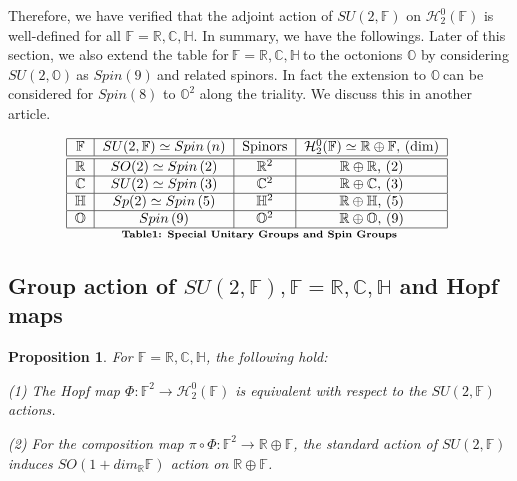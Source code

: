 \documentclass[a4paper]{article}%
\newtheorem{proposition}[theorem]{Proposition}
\begin{document}
Therefore, we have verified that the adjoint action of $SU(2,\mathbb{F})$ on
$\mathcal{H}_{2}^{0}(\mathbb{F})$ is well-defined for all $\mathbb{F}%
=\mathbb{R},\mathbb{C},\mathbb{H}$. In summary, we have the followings. Later
of this section, we also extend the table for$\ \mathbb{F}=\mathbb{R}%
,\mathbb{C},\mathbb{H\ }$to the octonions $\mathbb{O}$ by considering
$SU(2,\mathbb{O})\ $as $Spin\left(  9\right)  \ $and related spinors. In fact
the extension to $\mathbb{O\ }$can be considered for $Spin\left(  8\right)  $
to $\mathbb{O}^{2}$ along the triality. We discuss this in another article.%

\[
\underset{\text{\textbf{Table1: Special\ Unitary\ Groups\ and Spin Groups}}}{%
\begin{tabular}
[c]{|c|c|c|c|}\hline
$\mathbb{F}$ & $SU(2,\mathbb{F})\simeq Spin\left(  n\right)  $ & Spinors &
$\mathcal{H}_{2}^{0}(\mathbb{F})\simeq\mathbb{R}\oplus\mathbb{F}$, $\left(
\dim\right)  $\\\hline\hline
$\mathbb{R}$ & $SO(2)\simeq Spin\left(  2\right)  $ & $\mathbb{R}^{2}$ &
$\mathbb{R}\oplus\mathbb{R}$,$\mathbb{\ (}2\mathbb{)}$\\\hline
$\mathbb{C}$ & $SU(2)\simeq Spin\left(  3\right)  $ & $\mathbb{C}^{2}$ &
$\mathbb{R}\oplus\mathbb{C}$, $\mathbb{(}3\mathbb{)}$\\\hline
$\mathbb{H}$ & $Sp(2)\simeq Spin\left(  5\right)  $ & $\mathbb{H}^{2}$ &
$\mathbb{R}\oplus\mathbb{H}$,$\ \mathbb{(}5\mathbb{)}$\\\hline
$\mathbb{O}$ & $Spin\left(  9\right)  $ & $\mathbb{O}^{2}$ & $\mathbb{R}%
\oplus\mathbb{O}$,$\ \mathbb{(}9\mathbb{)}$\\\hline
\end{tabular}
\ }%
\]


\bigskip

\subsection{Group action of $SU(2,\mathbb{F}),\mathbb{F}=\mathbb{R}%
,\mathbb{C},\mathbb{H}$ and Hopf maps}

\begin{proposition}
\label{SORCH} For $\mathbb{F}=\mathbb{R},\mathbb{C},\mathbb{H}$, the following hold:

(1) The Hopf map $\Phi:\mathbb{F}^{2}\rightarrow\mathcal{H}_{2}^{0}%
(\mathbb{F})$ is equivalent with respect to the $SU(2,\mathbb{F})$ actions.

(2) For the composition map $\pi\circ\Phi:\mathbb{F}^{2}\rightarrow
\mathbb{R}\oplus\mathbb{F}$, the standard action of $SU(2,\mathbb{F})$ induces
$SO(1+dim_{\mathbb{R}}\mathbb{F})$ action on $\mathbb{R}\oplus\mathbb{F}$.
\end{proposition}
\end{document}
